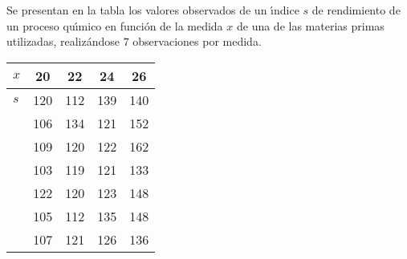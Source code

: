 \ifspanish

\question Se presentan en la tabla los valores observados de un \'{\i}ndice $s$ de rendimiento de un proceso 
 qu\'{\i}mico en funci\'{o}n de la medida $x$ de una de las materias primas utilizadas, realiz\'{a}ndose $7$ observaciones 
 por medida.
 \begin{center} 
   \begin{tabular}{|| l |c|c|c|c ||}
     \hline $x$ & 20 & 22 & 24 & 26 \\ \hline \hline
	   $s$ & 120 & 112 & 139 & 140 \\
	       & 106 & 134  & 121  & 152  \\ 
	       & 109 & 120  & 122  & 162  \\
	       & 103 & 119  & 121  & 133  \\
	       & 122 & 120  & 123  & 148  \\
	       & 105 & 112  & 135  & 148  \\
	       & 107 & 121  & 126  & 136  \\ \hline 
   \end{tabular}
 \end{center}

\begin{solution}
\end{solution}

